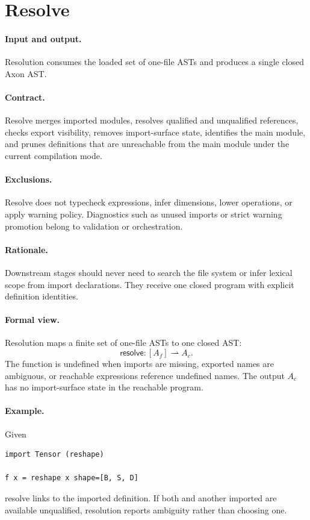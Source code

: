 \section{Resolve}

\paragraph{Input and output.}
Resolution consumes the loaded set of one-file ASTs and produces a single
closed Axon AST.

\paragraph{Contract.}
Resolve merges imported modules, resolves qualified and unqualified references,
checks export visibility, removes import-surface state, identifies the main
module, and prunes definitions that are unreachable from the main module under
the current compilation mode.

\paragraph{Exclusions.}
Resolve does not typecheck expressions, infer dimensions, lower operations, or
apply warning policy.  Diagnostics such as unused imports or strict warning
promotion belong to validation or orchestration.

\paragraph{Rationale.}
Downstream stages should never need to search the file system or infer lexical
scope from import declarations.  They receive one closed program with explicit
definition identities.

\paragraph{Formal view.}
Resolution maps a finite set of one-file ASTs to one closed AST:
\[
  \mathsf{resolve}: [A_f] \rightharpoonup A_c .
\]
The function is undefined when imports are missing, exported names are
ambiguous, or reachable expressions reference undefined names.  The output
\(A_c\) has no import-surface state in the reachable program.

\paragraph{Example.}
Given
\begin{verbatim}
import Tensor (reshape)

f x = reshape x shape=[B, S, D]
\end{verbatim}
resolve links  to the imported 
definition.  If both  and another imported 
are available unqualified, resolution reports ambiguity rather than choosing
one.
